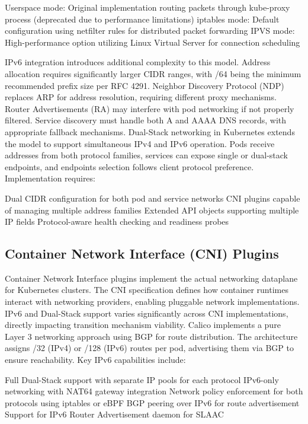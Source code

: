 Userspace mode: Original implementation routing packets through kube-proxy process (deprecated due to performance limitations)
iptables mode: Default configuration using netfilter rules for distributed packet forwarding
IPVS mode: High-performance option utilizing Linux Virtual Server for connection scheduling

IPv6 integration introduces additional complexity to this model. Address allocation requires significantly larger CIDR ranges, with /64 being the minimum recommended prefix size per RFC 4291. Neighbor Discovery Protocol (NDP) replaces ARP for address resolution, requiring different proxy mechanisms. Router Advertisements (RA) may interfere with pod networking if not properly filtered. Service discovery must handle both A and AAAA DNS records, with appropriate fallback mechanisms.
Dual-Stack networking in Kubernetes extends the model to support simultaneous IPv4 and IPv6 operation. Pods receive addresses from both protocol families, services can expose single or dual-stack endpoints, and endpoints selection follows client protocol preference. Implementation requires:

Dual CIDR configuration for both pod and service networks
CNI plugins capable of managing multiple address families
Extended API objects supporting multiple IP fields
Protocol-aware health checking and readiness probes

\subsection{Container Network Interface (CNI) Plugins}

Container Network Interface plugins implement the actual networking dataplane for Kubernetes clusters. The CNI specification defines how container runtimes interact with networking providers, enabling pluggable network implementations. IPv6 and Dual-Stack support varies significantly across CNI implementations, directly impacting transition mechanism viability.
Calico implements a pure Layer 3 networking approach using BGP for route distribution. The architecture assigns /32 (IPv4) or /128 (IPv6) routes per pod, advertising them via BGP to ensure reachability. Key IPv6 capabilities include:

Full Dual-Stack support with separate IP pools for each protocol
IPv6-only networking with NAT64 gateway integration
Network policy enforcement for both protocols using iptables or eBPF
BGP peering over IPv6 for route advertisement
Support for IPv6 Router Advertisement daemon for SLAAC

